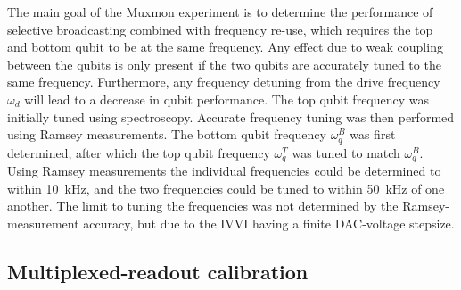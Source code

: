         The main goal of the Muxmon experiment is to determine the performance of selective broadcasting combined with frequency re-use, which requires the top and bottom qubit to be at the same frequency. Any effect due to weak coupling between the qubits is only present if the two qubits are accurately tuned to the same frequency. Furthermore, any frequency detuning from the drive frequency $\omega_d$ will lead to a decrease in qubit performance. The top qubit frequency was initially tuned using spectroscopy. Accurate frequency tuning was then performed using Ramsey measurements. The bottom qubit frequency $\omega_q^B$ was first determined, after which the top qubit frequency $\omega_q^T$  was tuned to match $\omega_q^B$. Using Ramsey measurements the individual frequencies could be determined to within \SI{10}{\kilo \hertz}, and the two frequencies could be tuned to within \SI{50}{\kilo \hertz} of one another. The limit to tuning the frequencies was not determined by the Ramsey-measurement accuracy, but due to the IVVI having a finite DAC-voltage stepsize.

      \subsection{Multiplexed-readout calibration}
        \label{ssec:multiplexed readout}

